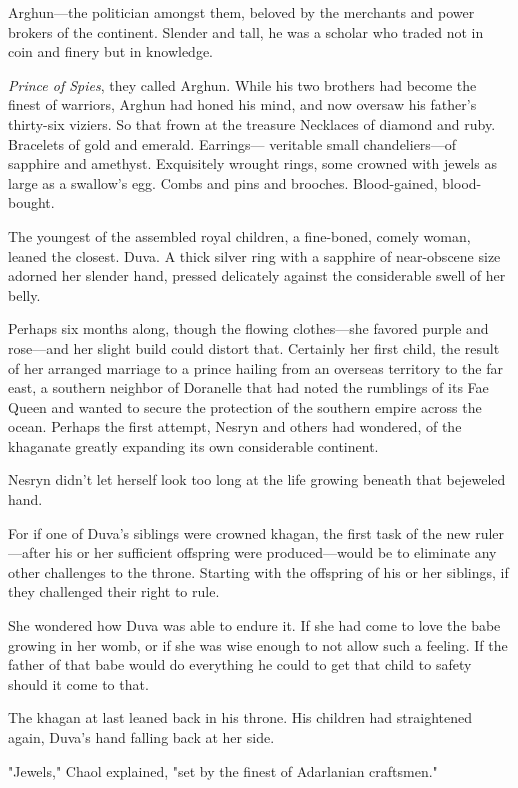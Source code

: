 Arghun---the politician amongst them, beloved by the merchants and power brokers of the continent.
Slender and tall, he was a scholar who traded not in coin and finery but in knowledge.

\emph{Prince of Spies}, they called Arghun.
While his two brothers had become the finest of warriors, Arghun had honed his mind, and now oversaw his father's thirty-six viziers.
So that frown at the treasure Necklaces of diamond and ruby.
Bracelets of gold and emerald.
Earrings--- veritable small chandeliers---of sapphire and amethyst.
Exquisitely wrought rings, some crowned with jewels as large as a swallow's egg.
Combs and pins and brooches.
Blood-gained, blood-bought.

The youngest of the assembled royal children, a fine-boned, comely woman, leaned the closest.
Duva.
A thick silver ring with a sapphire of near-obscene size adorned her slender hand, pressed delicately against the considerable swell of her belly.

Perhaps six months along, though the flowing clothes---she favored purple and rose---and her slight build could distort that.
Certainly her first child, the result of her arranged marriage to a prince hailing from an overseas territory to the far east, a southern neighbor of Doranelle that had noted the rumblings of its Fae Queen and wanted to secure the protection of the southern empire across the ocean.
Perhaps the first attempt, Nesryn and others had wondered, of the khaganate greatly expanding its own considerable continent.

Nesryn didn't let herself look too long at the life growing beneath that bejeweled hand.

For if one of Duva's siblings were crowned khagan, the first task of the new ruler---after his or her sufficient offspring were produced---would be to eliminate any other challenges to the throne.
Starting with the offspring of his or her siblings, if they challenged their right to rule.

She wondered how Duva was able to endure it.
If she had come to love the babe growing in her womb, or if she was wise enough to not allow such a feeling.
If the father of that babe would do everything he could to get that child to safety should it come to that.

The khagan at last leaned back in his throne.
His children had straightened again, Duva's hand falling back at her side.

"Jewels," Chaol explained, "set by the finest of Adarlanian craftsmen."


